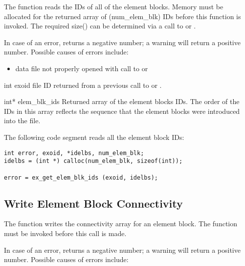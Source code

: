 The function  reads the IDs of all of
the element blocks. Memory must be allocated for the returned array of
({num_elem_blk}) IDs before this function is invoked. The required
size() can be determined via a call to
 or .


In case of an error,  returns 
a negative number; a warning will return a positive number. 
Possible causes of errors include:

\begin{itemize}
 \item data file not properly opened with call to 
 or 
\end{itemize}


\begin{parameters}
\item[{int exoid \R{}}]
\exo{} file ID returned from a previous call to  
or .

\item[{int* elem_blk_ids \W{}}]
Returned array of the element blocks IDs. The order of the IDs in this
array reflects the sequence that the element blocks were introduced
into the file.
\end{parameters}

The following code segment reads all the element block IDs:

\begin{lstlisting}
int error, exoid, *idelbs, num_elem_blk;
idelbs = (int *) calloc(num_elem_blk, sizeof(int));

error = ex_get_elem_blk_ids (exoid, idelbs);
\end{lstlisting}

\subsection{Write Element Block Connectivity}

The function  writes the connectivity array
for an element block. The function  must
be invoked before this call is made.


In case of an error,  returns a 
negative number; a warning will return a positive number.
Possible causes of errors include:

